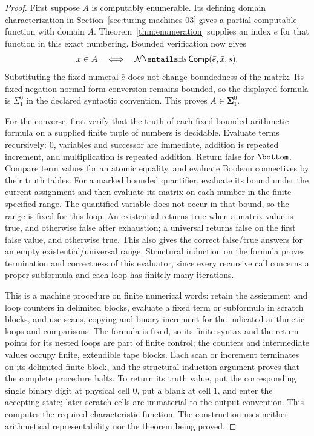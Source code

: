 \begin{proof}
First suppose \(A\) is computably enumerable.  Its defining
domain characterization in Section~\ref{sec:turing-machines-03}
gives a partial computable function with domain \(A\).
Theorem~\ref{thm:enumeration} supplies an index \(e\) for that function
in this exact numbering.  Bounded verification now gives
\[
 x\in A\quad\Longleftrightarrow\quad
 \mathcal N\entails\exists s\,\mathsf{Comp}(\bar e,\bar x,s).
\]
Substituting the fixed numeral \(\bar e\) does not change
boundedness of the matrix.  Its fixed negation-normal-form
conversion remains bounded, so the displayed formula is
\(\Sigma^0_1\) in the declared syntactic convention.  This proves
\(A\in\boldsymbol{\Sigma}^0_1\).

For the converse, first verify that the truth of each fixed bounded
arithmetic formula on a supplied finite tuple of numbers is decidable.
Evaluate terms recursively: \(0\), variables and successor are
immediate, addition is repeated increment, and multiplication is
repeated addition.  Return false for \(\bottom\).  Compare term values
for an atomic equality, and evaluate Boolean connectives by their
truth tables.  For a marked bounded quantifier, evaluate its bound
under the current assignment and then evaluate its matrix on each
number in the finite specified range.  The quantified variable does
not occur in that bound, so the range is fixed for this loop.
An existential returns true when a matrix value is true, and
otherwise false after exhaustion; a universal returns false on
the first false value, and otherwise true.  This also gives the
correct false/true answers for an empty existential/universal range.
Structural induction on the formula proves termination and correctness
of this evaluator, since every recursive call concerns a proper
subformula and each loop has finitely many iterations.

This is a machine procedure on finite numerical words: retain the
assignment and loop counters in delimited blocks, evaluate a fixed
term or subformula in scratch blocks, and use scans, copying and
binary increment for the indicated arithmetic loops and comparisons.
The formula is fixed, so its finite syntax and the return points
for its nested loops are part of finite control; the counters and
intermediate values occupy finite, extendible tape blocks.
Each scan or increment terminates on its delimited finite block,
and the structural-induction argument proves that the complete
procedure halts.  To return its truth value, put the corresponding
single binary digit at physical cell \(0\), put a blank at cell \(1\),
and enter the accepting state; later scratch cells are immaterial to
the output convention.  This computes the required characteristic function.
The construction
uses neither arithmetical representability nor the theorem being proved.


\end{proof}
